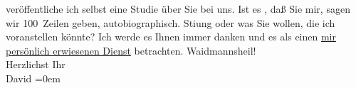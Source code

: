 \begin{ledgroupsized}[t]{13cm}
                    veröffentliche ich selbst eine Studie über Sie bei uns. Ist es \label{K_L00500_2v}\label{K_L00500_2h}, daß Sie mir, sagen wir 100 Zeilen geben,
                    autobiographisch. Sti{\geminationm}ung oder was Sie wollen, die
                    ich voranstellen könnte? Ich werde {\pb}es Ihnen immer danken und es als einen \uline{mir
                        persönlich erwiesenen Dienst} betrachten.\pend
           \pstart
           Waidmannsheil!{\\[\baselineskip]}Herzlichst Ihr{\\[\baselineskip]}\spacefill\mbox{David}\pend
           \leftskip=0em{}\endnumbering{}\end{ledgroupsized}  \newcommand{\dateiname}{L00500}\newcommand{\titel}{Jakob Julius David an Arthur Schnitzler, [5. 10. 1895]}\newcommand{\editorInnen}{Martin Anton Müller und Gerd-Hermann Susen}
            \footnotesize
\begin{ledgroupsized}[t]{11.5cm}
\end{ledgroupsized}
         
      